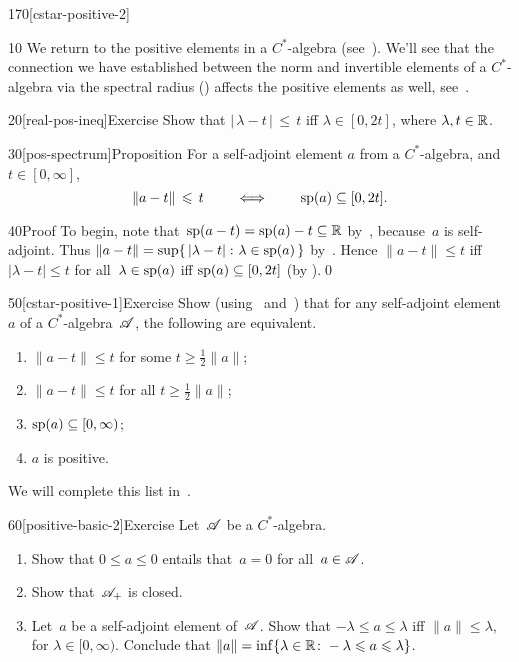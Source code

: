 \begin{parsec}{170}[cstar-positive-2]%
\begin{point}{10}%
We return to the positive elements 
in a $C^*$-algebra (see~).
We'll see that the connection we have established
between the norm and invertible elements
of a $C^*$-algebra
via the spectral radius ()
affects the positive elements as well, see~.
\end{point}
\begin{point}{20}[real-pos-ineq]{Exercise}%
Show that 
$\left|\,\lambda-t\,\right| \,\leq\, t$ iff  $\lambda \in[0,2t]$,
where $\lambda,t\in\mathbb{R}$.
\end{point}
\begin{point}{30}[pos-spectrum]{Proposition}%
For a self-adjoint element $a$ from a $C^*$-algebra,
and $t\in [0,\infty]$, 
\begin{equation*}
\|a-t\|\,\leqslant\, t\qquad\iff\qquad \mathrm{sp}(a)\subseteq [0,2t].
\end{equation*}%
\spacingfix{}%
\begin{point}{40}{Proof}%
To begin, note that~$\mathrm{sp}(a-t)=\mathrm{sp}(a)-t\subseteq \mathbb{R}$ 
by~,
because~$a$ is self-adjoint.
Thus $\|a-t\|=\sup\{\,\left|\lambda-t\right|\colon \lambda\in \mathrm{sp}(a)\,\}$
by~.
Hence $\|a-t\|\leq t$
iff $\left|\lambda-t\right|\leq t$ for all~$\lambda\in\mathrm{sp}(a)$
iff $\mathrm{sp}(a)\subseteq [0,2t]$ (by ).\qed
\end{point}
\end{point}
\begin{point}{50}[cstar-positive-1]{Exercise}%
%
Show
(using~ and~)
that
for any self-adjoint element $a$ of a $C^*$-algebra~$\mathscr{A}$,
the following are equivalent.
\begin{enumerate}
\item 
\label{cstar-pos-1}
$\|a-t\|\leq t$
for some $t\geq \frac{1}{2}\|a\|$;
\item 
\label{cstar-pos-2}
$\|a-t\|\leq t$
for all $t\geq \frac{1}{2}\|a\|$;
\item 
\label{cstar-pos-3}
$\mathrm{sp}(a)\subseteq[0,\infty)$;
\item
$a$ is positive.
\end{enumerate}
We will complete this list in~.
\end{point}
\begin{point}{60}[positive-basic-2]{Exercise}%
Let~$\mathscr{A}$ be a $C^*$-algebra.
\begin{enumerate}
\item
Show that $0\leq a\leq 0$ entails that~$a=0$
for all~$a\in\mathscr{A}$.
\item
Show that~$\mathscr{A}_{+}$ is closed.
\item
Let~$a$ be a self-adjoint element of~$\mathscr{A}$.
Show that
 $-\lambda \leq a\leq \lambda$
iff $\|a\|\leq \lambda$,
for $\lambda\in [0,\infty)$.
Conclude that $\|a\| = \inf\{ \lambda \in \mathbb{R}\colon 
-\lambda \leqslant a\leqslant \lambda\}$.


\end{enumerate}
\end{point}
\end{parsec}
